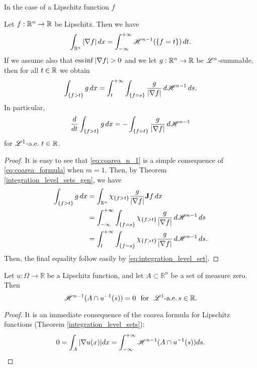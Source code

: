 In the case of a Lipschitz function $f$

\begin{theorem} \label{integration_level_sets}
Let $f : \mathbb{R}^{n} \to \mathbb{R}$ be Lipschitz. Then we have
\begin{equation} \label{eq:coarea_n_1}
\int_{\mathbb{R}^{n}} |\nabla f| \, dx = \int_{- \infty}^{+ \infty} \mathscr{H}^{n - 1}(\{f = t\}) \, dt.
\end{equation}
If we assume also that ${\rm ess} \inf |\nabla f| > 0$ and we let $g : \mathbb{R}^{n} \to \mathbb{R}$ be $\mathscr{L}^{n}$-summable, then for all $t \in \mathbb{R}$ we obtain
\begin{equation} \label{eq:integration_level_set}
\int_{\{f > t \}} g \, dx = \int_{t}^{+ \infty} \int_{\{f =s\}} \frac{g}{|\nabla f|} \, d \mathscr{H}^{n - 1} \, ds.
\end{equation}
In particular, 
\begin{equation*}
\frac{d}{dt} \int_{\{f > t\}} g \, dx = - \int_{\{f = t\}} \frac{g}{|\nabla f|} \, d \mathscr{H}^{n -1}
\end{equation*}
for $\mathscr{L}^{1}$-a.e. $t \in \mathbb{R}$.
\end{theorem}
\begin{proof}
It is easy to see that \eqref{eq:coarea_n_1} is a simple consequence of \eqref{eq:coarea_formula} when $m = 1$. Then, by Theorem \ref{integration_level_sets_gen}, we have
\begin{align*}
\int_{\{f > t\}} g \, dx & = \int_{\mathbb{R}^{n}} \chi_{\{f > t\}} \frac{g}{|\nabla f|} {\bf J} f \, dx \\
& = \int_{- \infty}^{+ \infty} \int_{\{ f = s\}} \chi_{\{f > t\}} \frac{g}{|\nabla f|} \, d \mathscr{H}^{n - 1} \, ds \\
& = \int_{t}^{+ \infty} \int_{\{ f = s\}} \chi_{\{f > t\}} \frac{g}{|\nabla f|} \, d \mathscr{H}^{n - 1} \, ds.
\end{align*}
Then, the final equality follow easily by \eqref{eq:integration_level_set}.
\end{proof}

\begin{lemma} \label{nullcoarea} Let $u : \Omega \to \mathbb{R}$ be a Lipschitz function, and let $A \subset \mathbb{R}^{n}$ be a set of measure zero.
\\
Then 
\[ \Haus{n-1}(A \cap u^{-1}(s) ) = 0 \  \ \text{for} \ \ \Leb{1}\text{-a.e.} \, s \in \mathbb{R}. \]
\end{lemma}

\begin{proof} It is an immediate consequence of the coarea formula for Lipschitz functions (Theorem \ref{integration_level_sets}):
\begin{equation*} 
0 = \int_{A} |\nabla u(x)| dx = \int_{-\infty}^{+\infty} \mathscr{H}^{n-1}(A \cap u^{-1}(s)) ds.
\end{equation*} 
\end{proof}

